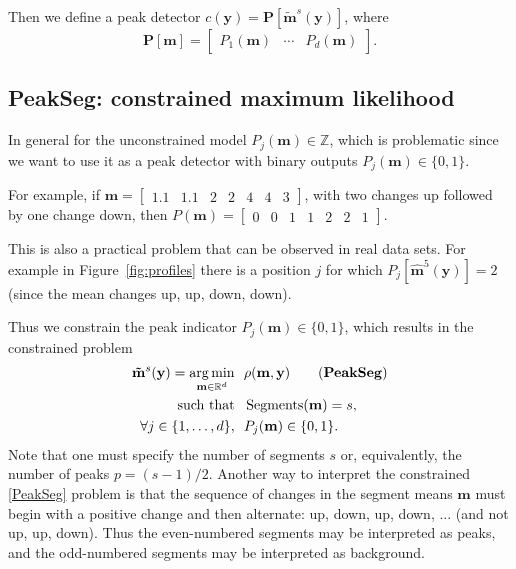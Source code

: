\documentclass{article}
\DeclareMathOperator*{\argmin}{arg\,min}
\DeclareMathOperator*{\Segments}{Segments}
\newcommand{\ZZ}{\mathbb Z}
\newcommand{\RR}{\mathbb R}
\begin{document}
Then we define a peak detector $c(\mathbf y) = \mathbf P\left[
  \mathbf{\tilde m}^s(\mathbf y) \right]$, where
\begin{equation}
  \mathbf
P[\mathbf m] = \left[\begin{array}{ccc} P_1(\mathbf m) & \cdots &
    P_d(\mathbf m)
\end{array}\right].
\end{equation}

\subsection{PeakSeg: constrained maximum likelihood}
\label{sec:constrained}

In general for the unconstrained model $P_j(\mathbf m)\in\ZZ$, which
is problematic since we want to use it as a peak detector with binary
outputs $P_j(\mathbf m)\in \{0, 1\}$. 

For example, if $\mathbf m = \left[\begin{array}{ccccccc}1.1 &
    1.1 & 2 & 2 & 4 & 4 & 3\end{array}\right]$, with two changes up
followed by one change down, then $P(\mathbf m) =
\left[\begin{array}{ccccccc}0 & 0 & 1 & 1 & 2 & 2 &
    1 \end{array}\right]$.

This is also a practical problem that can be observed in real data
sets. For example in Figure~\ref{fig:profiles} there is a position $j$ for
which $P_j\left[ \mathbf{\hat m}^5(\mathbf y) \right]=2$ (since the
mean changes up, up, down, down). 

Thus we constrain the peak indicator $P_j(\mathbf
m)\in\{0, 1\}$, which results
in the constrained problem
\begin{align*}
  \label{PeakSeg}
  \mathbf{\tilde m}^s(\mathbf y)  =
    \argmin_{\mathbf m\in\RR^{d}} &\ \ 
    \rho(\mathbf m, \mathbf y) 
    \tag{\textbf{PeakSeg}}
\\
    \text{such that} &\ \  \Segments(\mathbf m)=s,  \\
     \forall j\in\{1, \dots, d\}, &\ \ P_j(\mathbf m) \in\{0, 1\}.
\end{align*}
Note that one must specify the number of segments $s$ or,
equivalently, the number of peaks $p=(s-1)/2$. Another way to
interpret the constrained \ref{PeakSeg} problem is that the sequence
of changes in the segment means $\mathbf m$ must begin with a positive
change and then alternate: up, down, up, down, ... (and not up, up,
down). Thus the even-numbered segments may be interpreted as peaks,
and the odd-numbered segments may be interpreted as background.
\end{document}
